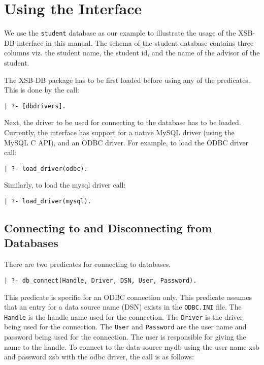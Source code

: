 \section{Using the Interface}

We use the {\tt student} database as our example to illustrate 
the usage of the XSB-DB interface in this manual. The schema of the
student database contains three columns viz. the student name, 
the student id, and the name of the advisor of the student.

The XSB-DB package has to be first loaded before using any of the
predicates. This is done by the call:

\begin{verbatim}
| ?- [dbdrivers].
\end{verbatim}

Next, the driver to be used for connecting to the database has to 
be loaded. Currently, the interface has support for a native MySQL driver
(using the MySQL C API), and an ODBC driver. For example, to load 
the ODBC driver call:

\begin{verbatim}
| ?- load_driver(odbc).
\end{verbatim}

Similarly, to load the mysql driver call:

\begin{verbatim}
| ?- load_driver(mysql).
\end{verbatim}

\subsection{Connecting to and Disconnecting from Databases}

There are two predicates for connecting to databases. 

\begin{verbatim}
| ?- db_connect(Handle, Driver, DSN, User, Password).
\end{verbatim}

This predicate is specific for an ODBC connection only.
This predicate assumes that an entry for a data source name (DSN) exists
in the {\tt ODBC.INI} file. The {\tt Handle} is the handle name used for 
the connection. The {\tt Driver} is the driver being used for the 
connection.
The {\tt User} and {\tt Password} are the user name and password 
being used for the connection. The user is responsible for giving 
the name to the handle.
To connect to the data source mydb using the user name xsb and password xsb
with the odbc driver, the call is as follows: 

